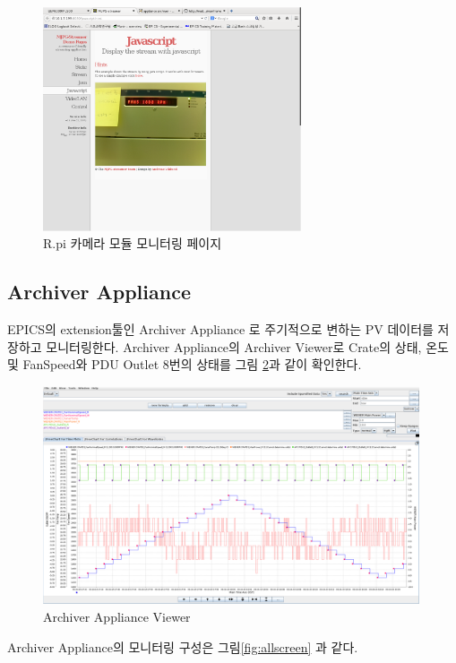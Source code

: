 \documentclass[11pt
  , a4paper
  , article
  , oneside
]{memoir}
\begin{document}
\begin{figure}[h!]
  \centering
  \includegraphics[width=0.68\textwidth]{./images/javapage.eps}
  \caption{R.pi 카메라 모듈 모니터링 페이지}
  \label{fig:javapage}   
\end{figure}

\subsection{Archiver Appliance}
EPICS의 extension툴인 Archiver Appliance 로 주기적으로 변하는 PV 데이터를 저장하고 모니터링한다. Archiver Appliance의 Archiver Viewer로 Crate의 상태, 온도 및 FanSpeed와 PDU Outlet 8번의 상태를 그림 \ref{fig:aaviewer}과 같이 확인한다.

\begin{figure}[h!]
  \centering
  \includegraphics[width=0.99\textwidth]{./images/aaviewer_2.eps}
  \caption{Archiver Appliance Viewer}
  \label{fig:aaviewer}   
\end{figure}

Archiver Appliance의 모니터링 구성은 그림\ref{fig:allscreen} 과 같다. 
\end{document}
